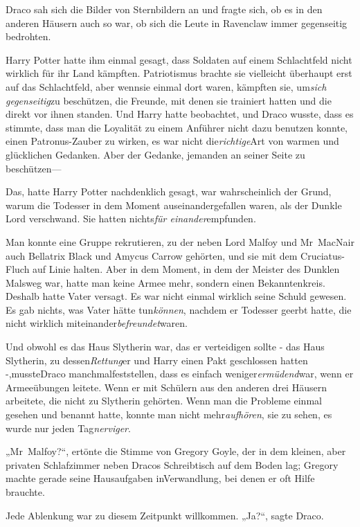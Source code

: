 {Draco sah sich die Bilder von Sternbildern an und fragte sich, ob es in den anderen Häusern auch so war, ob sich die Leute in Ravenclaw immer gegenseitig bedrohten.

Harry Potter hatte ihm einmal gesagt, dass Soldaten auf einem Schlachtfeld nicht wirklich für ihr Land kämpften. Patriotismus brachte sie vielleicht überhaupt erst auf das Schlachtfeld, aber wennsie einmal dort waren, kämpften sie, um\emph{sich gegenseitig}zu beschützen, die Freunde, mit denen sie trainiert hatten und die direkt vor ihnen standen. Und Harry hatte beobachtet, und Draco wusste, dass es stimmte, dass man die Loyalität zu einem Anführer nicht dazu benutzen konnte, einen Patronus-Zauber zu wirken, es war nicht die\emph{richtige}Art von warmen und glücklichen Gedanken. Aber der Gedanke, jemanden an seiner Seite zu beschützen—

Das, hatte Harry Potter nachdenklich gesagt, war wahrscheinlich der Grund, warum die Todesser in dem Moment auseinandergefallen waren, als der Dunkle Lord verschwand. Sie hatten nichts\emph{für einander}empfunden.

Man konnte eine Gruppe rekrutieren, zu der neben Lord Malfoy und Mr~MacNair auch Bellatrix Black und Amycus Carrow gehörten, und sie mit dem Cruciatus-Fluch auf Linie halten. Aber in dem Moment, in dem der Meister des Dunklen Malsweg war, hatte man keine Armee mehr, sondern einen Bekanntenkreis. Deshalb hatte Vater versagt. Es war nicht einmal wirklich seine Schuld gewesen. Es gab nichts, was Vater hätte tun\emph{können}, nachdem er Todesser geerbt hatte, die nicht wirklich miteinander\emph{befreundet}waren.

Und obwohl es das Haus Slytherin war, das er verteidigen sollte - das Haus Slytherin, zu dessen\emph{Rettung}er und Harry einen Pakt geschlossen hatten -,mussteDraco manchmalfeststellen, dass es einfach weniger\emph{ermüdend}war, wenn er Armeeübungen leitete. Wenn er mit Schülern aus den anderen drei Häusern arbeitete, die nicht zu Slytherin gehörten. Wenn man die Probleme einmal gesehen und benannt hatte, konnte man nicht mehr\emph{aufhören}, sie zu sehen, es wurde nur jeden Tag\emph{nerviger}.

„Mr~Malfoy?“, ertönte die Stimme von Gregory Goyle, der in dem kleinen, aber privaten Schlafzimmer neben Dracos Schreibtisch auf dem Boden lag; Gregory machte gerade seine Hausaufgaben inVerwandlung, bei denen er oft Hilfe brauchte.

Jede Ablenkung war zu diesem Zeitpunkt willkommen. „Ja?“, sagte Draco.

}
